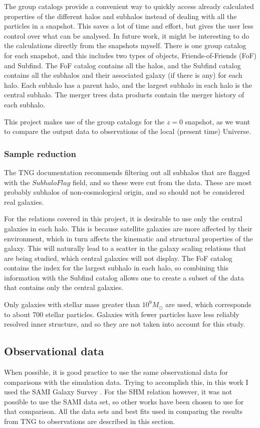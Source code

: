 The group catalogs provide a convenient way to quickly access already calculated properties of the different halos and subhalos instead of dealing with all the particles in a snapshot. This saves a lot of time and effort, but gives the user less control over what can be analysed. In future work, it might be interesting to do the calculations directly from the snapshots myself. There is one group catalog for each snapshot, and this includes two types of objects, Friends-of-Friends (FoF) and Subfind. The FoF catalog contains all the halos, and the Subfind catalog contains all the subhalos and their associated galaxy (if there is any) for each halo. Each subhalo has a parent halo, and the largest subhalo in each halo is the central subhalo. The merger trees data products contain the merger history of each subhalo.

This project makes use of the group catalogs for the $z = 0$ snapshot, as we want to compare the output data to observations of the local (present time) Universe.

\subsubsection{Sample reduction}

The TNG documentation recommends filtering out all subhalos that are flagged with the $SubhaloFlag$ field, and so these were cut from the data. These are most probably subhalos of non-cosmological origin, and so should not be considered real galaxies.

For the relations covered in this project, it is desirable to use only the central galaxies in each halo. This is because satellite galaxies are more affected by their environment, which in turn affects the kinematic and structural properties of the galaxy. This will naturally lead to a scatter in the galaxy scaling relations that are being studied, which central galaxies will not display. The FoF catalog contains the index for the largest subhalo in each halo, so combining this information with the Subfind catalog allows one to create a subset of the data that contains only the central galaxies.

Only galaxies with stellar mass greater than $10^9 M_{\odot}$ are used, which corresponds to about 700 stellar particles. Galaxies with fewer particles have less reliably resolved inner structure, and so they are not taken into account for this study.

\subsection{Observational data}
When possible, it is good practice to use the same observational data for comparisons with the simulation data. Trying to accomplish this, in this work I used the SAMI Galaxy Survey \parencite{Bryant2015}. For the SHM relation however, it was not possible to use the SAMI data set, so other works have been chosen to use for that comparison. All the data sets and best fits used in comparing the results from TNG to observations are described in this section.


